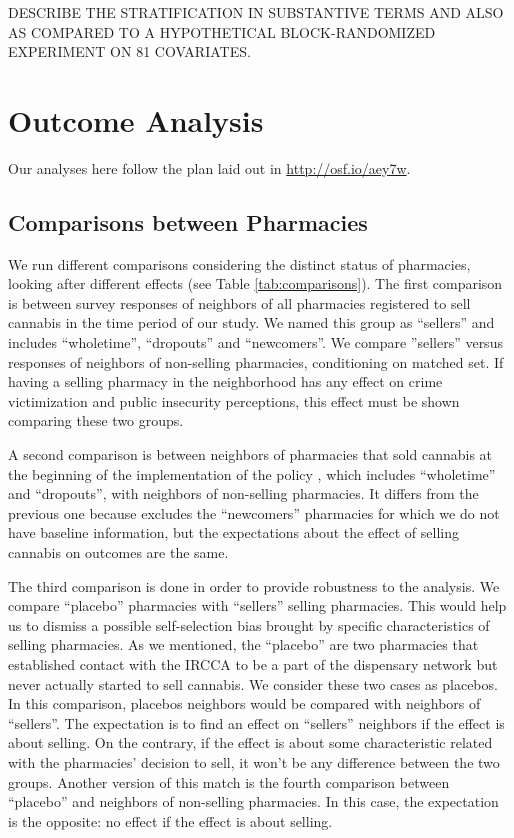 \documentclass[11pt]{article}
\begin{document}
DESCRIBE THE STRATIFICATION IN SUBSTANTIVE TERMS AND ALSO AS COMPARED TO A HYPOTHETICAL BLOCK-RANDOMIZED EXPERIMENT ON 81 COVARIATES.

\section{Outcome Analysis}

Our analyses here follow the plan laid out in \href{our
pre-registration}{http://osf.io/aey7w}.

\subsection{Comparisons between Pharmacies}
We run different comparisons considering the distinct status of pharmacies, looking after different effects (see Table \ref{tab:comparisons}). The first comparison is between survey responses of neighbors of all pharmacies registered to sell cannabis in the time period of our study. We named this group as ``sellers'' and includes ``wholetime'', ``dropouts'' and ``newcomers''. We compare ''sellers'' versus responses of neighbors of non-selling pharmacies, conditioning on matched set. If having a selling pharmacy in the neighborhood has any effect on crime victimization and public insecurity perceptions, this effect must be shown comparing these two groups.

A second comparison is between neighbors of pharmacies that sold cannabis at the beginning of the implementation of the policy , which includes ``wholetime'' and ``dropouts'', with neighbors of non-selling pharmacies. It differs from the previous one because excludes the ``newcomers'' pharmacies for which we do not have baseline information, but the expectations about the effect of selling cannabis on outcomes are the same.

The third comparison is done in order to provide robustness to the analysis. We compare ``placebo'' pharmacies with ``sellers'' selling pharmacies. This would help us to dismiss a possible self-selection bias brought by specific characteristics of selling pharmacies. As we mentioned, the ``placebo'' are two pharmacies that established contact with the IRCCA to be a part of the dispensary network but never actually started to sell cannabis. We consider these two cases as placebos. In this comparison, placebos neighbors would be compared with neighbors of ``sellers''. The expectation is to find an effect on ``sellers'' neighbors if the effect is about selling. On the contrary, if the effect is about some characteristic related with the pharmacies' decision to sell, it won't be any difference between the two groups. Another version of this match is the fourth comparison between ``placebo'' and neighbors of non-selling pharmacies. In this case, the expectation is the opposite: no effect if the effect is about selling.
\end{document}
